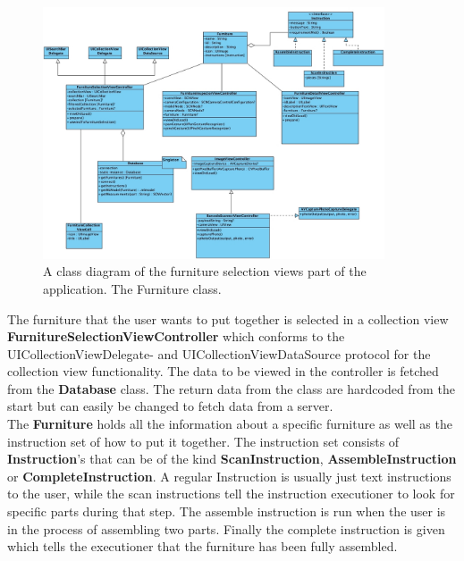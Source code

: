 \begin{figure}[!hbtp]
\begin{center}
\includegraphics[width = 0.9\textwidth]{./Images/FurnitureClassDiagram.jpg}
\caption{A class diagram of the furniture selection views part of the application. The Furniture class.}
\label{fig:classdiagramfurniture}
\end{center}
\end{figure}

The furniture that the user wants to put together is selected in a collection view \textbf{FurnitureSelectionViewController}
which conforms to the UICollectionViewDelegate- and UICollectionViewDataSource protocol for the collection view functionality.
The data to be viewed in the controller is fetched from the \textbf{Database} class.
The return data from the class are hardcoded from the start but can easily be changed to fetch
data from a server.\\

The \textbf{Furniture} holds all the information about a specific furniture as well as the instruction set of how to put it together. The instruction set consists of \textbf{Instruction}'s that can be
of the kind \textbf{ScanInstruction}, \textbf{AssembleInstruction} or \textbf{CompleteInstruction}.
A regular Instruction is usually just text instructions to the user, while the scan instructions tell the instruction executioner to look for specific parts during that step.
The assemble instruction is run when the user is in the process of assembling two parts.
Finally the complete instruction is given which tells the executioner that the furniture has been fully assembled.\\


